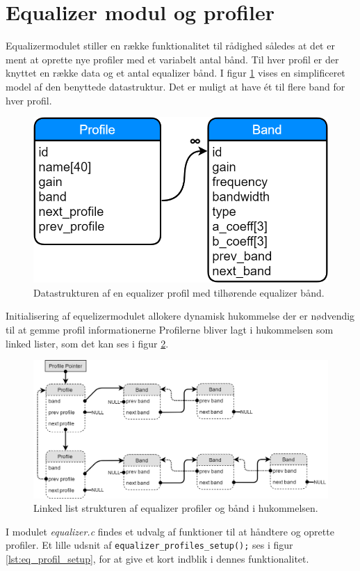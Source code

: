 \section{Equalizer modul og profiler}
Equalizermodulet stiller en række funktionalitet til rådighed således at det er ment at oprette nye profiler med et variabelt antal bånd.
Til hver profil er der knyttet en række data og et antal equalizer bånd.
I figur \ref{fig:eq-profile-db} vises en simplificeret model af den benyttede datastruktur.
Det er muligt at have ét til flere band for hver profil.

\begin{figure}[h!]
	\centering
	\includegraphics[width=.4\textwidth]{billeder/eq_profile_db.png}
	\caption{Datastrukturen af en equalizer profil med tilhørende equalizer bånd.}
	\label{fig:eq-profile-db}
\end{figure}

Initialisering af equelizermodulet allokere dynamisk hukommelse der er nødvendig til at gemme profil informationerne
Profilerne bliver lagt i hukommelsen som linked lister, som det kan ses i figur \ref{fig:eq-profile-linked}.

\begin{figure}[h!]
	\centering
	\includegraphics[width=.9\textwidth]{billeder/eq_linked_profiles.png}
	\caption{Linked list strukturen af equalizer profiler og bånd i hukommelsen.}
	\label{fig:eq-profile-linked}
\end{figure}

I modulet \textit{equalizer.c} findes et udvalg af funktioner til at håndtere og oprette profiler.
Et lille udsnit af \texttt{equalizer\_profiles\_setup();} ses i figur \ref{lst:eq_profil_setup}, for at give et kort indblik i dennes funktionalitet.

